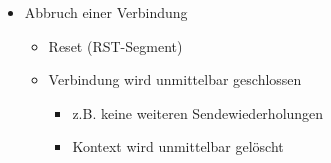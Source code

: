 \begin{itemize}
\begin{itemize}
\begin{itemize}
\begin{itemize}
                    \item In "Gegenrichtung" (Kontrolldaten (z.B. ACK), keine neuen Nutzdaten
                  \end{itemize}
              \end{itemize}
            \item Abbruch einer Verbindung
              \begin{itemize}
                \item Reset (RST-Segment)
                \item Verbindung wird unmittelbar geschlossen
                  \begin{itemize}
                    \item z.B. keine weiteren Sendewiederholungen
                    \item Kontext wird unmittelbar gelöscht
                  \end{itemize}
              \end{itemize}
          \end{itemize}
      \end{itemize}
